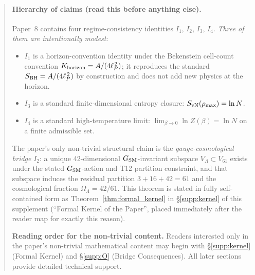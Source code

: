 \documentclass[11pt]{article}
\theoremstyle{plain}
\theoremstyle{definition}
\theoremstyle{remark}
\begin{document}
\begin{abstract}
\paragraph{Hierarchy of claims (read this before anything else).}  Paper~8 contains four regime-consistency identities $I_1$, $I_2$, $I_3$, $I_4$.  \emph{Three of them are intentionally modest}:
\begin{itemize}[leftmargin=2em,itemsep=1pt,topsep=2pt]
  \item $I_1$ is a horizon-convention identity under the Bekenstein cell-count convention $K_{\rm horizon} = A/(4\ell_P^{\,2})$; it reproduces the standard $S_{\rm BH} = A/(4\ell_P^{\,2})$ by construction and does not add new physics at the horizon.
  \item $I_3$ is a standard finite-dimensional entropy closure: $S_{\rm vN}(\rho_{\rm max}) = \ln N$.
  \item $I_4$ is a standard high-temperature limit: $\lim_{\beta \to 0} \ln Z(\beta) = \ln N$ on a finite admissible set.
\end{itemize}
\noindent The paper's only non-trivial structural claim is the \emph{gauge-cosmological bridge} $I_2$: a unique 42-dimensional $G_{\rm SM}$-invariant subspace $V_\Lambda \subset V_{61}$ exists under the stated $G_{\rm SM}$-action and T12 partition constraint, and that subspace induces the residual partition $3+16+42=61$ and the cosmological fraction $\Omega_\Lambda = 42/61$.  This theorem is stated in fully self-contained form as Theorem~\ref{thm:formal_kernel} in \S\ref{supp:kernel} of this supplement (``Formal Kernel of the Paper'', placed immediately after the reader map for exactly this reason).

\medskip

\noindent\textbf{Reading order for the non-trivial content.}  Readers interested only in the paper's non-trivial mathematical content may begin with \S\ref{supp:kernel} (Formal Kernel) and \S\ref{supp:O} (Bridge Consequences).  All later sections provide detailed technical support.


\end{abstract}
\end{document}
